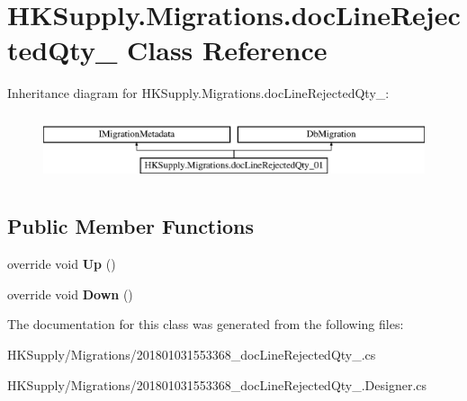 \hypertarget{class_h_k_supply_1_1_migrations_1_1doc_line_rejected_qty__01}{}\section{H\+K\+Supply.\+Migrations.\+doc\+Line\+Rejected\+Qty\+\_ Class Reference}
\label{class_h_k_supply_1_1_migrations_1_1doc_line_rejected_qty__01}
Inheritance diagram for H\+K\+Supply.\+Migrations.\+doc\+Line\+Rejected\+Qty\+\_\+:\begin{figure}[H]
\begin{center}
\leavevmode
\includegraphics[height=2.000000cm]{class_h_k_supply_1_1_migrations_1_1doc_line_rejected_qty__01}
\end{center}
\end{figure}
\subsection*{Public Member Functions}
\begin{DoxyCompactItemize}
\item 
\mbox{\label{class_h_k_supply_1_1_migrations_1_1doc_line_rejected_qty__01_a1405ac29ba3829ec7f2b7195ef09eaa6}} 
override void {\bfseries Up} ()
\item 
\mbox{\label{class_h_k_supply_1_1_migrations_1_1doc_line_rejected_qty__01_a5d645fb357d944acc7d307c5008ebfaf}} 
override void {\bfseries Down} ()
\end{DoxyCompactItemize}


The documentation for this class was generated from the following files\+:\begin{DoxyCompactItemize}
\item 
H\+K\+Supply/\+Migrations/201801031553368\+\_\+doc\+Line\+Rejected\+Qty\+\_.\+cs\item 
H\+K\+Supply/\+Migrations/201801031553368\+\_\+doc\+Line\+Rejected\+Qty\+\_.\+Designer.\+cs\end{DoxyCompactItemize}
